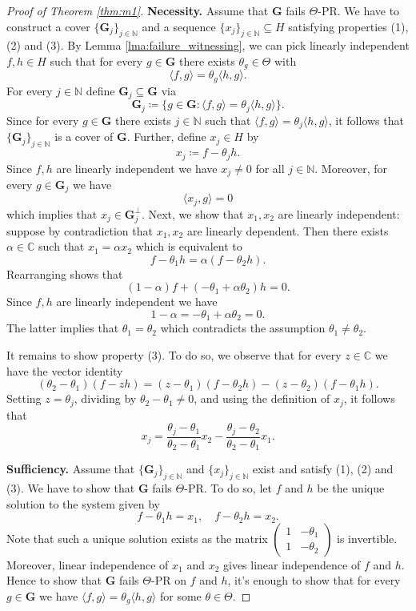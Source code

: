 \documentclass[reqno,a4paper,11pt]{amsart}
\numberwithin{equation}{section}
\def\N{{\mathbb N}}
\def\C{{\mathbb C}}
\newcommand\1{\mathds{1}}
\begin{document}
\begin{proof}[Proof of Theorem \ref{thm:m1}]
\textbf{Necessity.}
Assume that $\mathbf{G}$ fails $\Theta$-PR. We have to construct a cover $\{ \mathbf{G}_j \}_{j \in \N}$ and a sequence $\{ x_j \}_{j \in \N} \subseteq H$ satisfying properties (1), (2) and (3). By Lemma \ref{lma:failure_witnessing}, we can pick linearly independent $f,h \in H$ such that for every $g \in \mathbf{G}$ there exists $\theta_g \in \Theta$ with
$$
\langle f,g \rangle = \theta_g \langle h,g \rangle.
$$
For every $j \in \N$ define $\mathbf{G}_j \subseteq \mathbf{G}$ via
$$
\mathbf{G}_j \coloneqq \{ g \in \mathbf{G} : \langle f,g \rangle = \theta_j \langle h,g \rangle \}.
$$
Since for every $g \in \mathbf{G}$ there exists $j \in \N$ such that $\langle f,g \rangle = \theta_j \langle h,g \rangle$, it follows that $\{ \mathbf{G}_j \}_{j \in \N}$ is a cover of $\mathbf{G}$. Further, define $x_j \in H$ by
$$
x_j \coloneqq f-\theta_j h.
$$
Since $f,h$ are linearly independent we have $x_j \neq 0$ for all $j \in \N$. Moreover, for every $g \in \mathbf{G}_j$ we have
$$
\langle x_j, g \rangle =0
$$
which implies that $x_j \in \mathbf{G}_j^\perp$. Next, we show that $x_1,x_2$ are linearly independent: suppose by contradiction that $x_1,x_2$ are linearly dependent. Then there exists $\alpha \in \C$ such that $x_1 = \alpha x_2$ which is equivalent to
$$
f-\theta_1 h = \alpha ( f-\theta_2 h ).
$$
Rearranging shows that
$$
(1-\alpha) f + (-\theta_1 + \alpha \theta_2) h = 0.
$$
Since $f,h$ are linearly independent we have
$$
1-\alpha = -\theta_1 + \alpha \theta_2 = 0.
$$
The latter implies that $\theta_1 = \theta_2$ which contradicts the assumption $\theta_1 \neq \theta_2$.

It remains to show property (3). To do so, we observe that for every $z \in \C$ we have the vector identity
\begin{equation}\label{eq:vi}
    (\theta_2 - \theta_1)(f-zh) = (z-\theta_1)(f-\theta_2 h) - (z-\theta_2)(f-\theta_1h).
\end{equation}
Setting $z = \theta_j$, dividing by $\theta_2 - \theta_1 \neq 0$, and using the definition of $x_j$, it follows that
$$
x_j = \frac{\theta_j - \theta_1}{\theta_2 - \theta_1} x_2 - \frac{\theta_j - \theta_2}{\theta_2 - \theta_1} x_1.
$$

\textbf{Sufficiency.}
Assume that $\{ \mathbf{G}_j \}_{j \in \N}$ and $\{ x_j \}_{j \in \N}$ exist and satisfy (1), (2) and (3). We have to show that $\mathbf{G}$ fails $\Theta$-PR. To do so, let $f$ and $h$ be the unique solution to the system given by
$$
f-\theta_1 h = x_1, \quad f-\theta_2 h = x_2.
$$
Note that such a unique solution exists as the matrix $\begin{pmatrix}
    1 & -\theta_1 \\
    1 & -\theta_2
\end{pmatrix}$ is invertible. Moreover, linear independence of $x_1$ and $x_2$ gives linear independence of $f$ and $h$. Hence to show that $\mathbf{G}$ fails $\Theta$-PR on $f$ and $h$, it's enough to show that for every $g\in \mathbf{G}$ we have $\langle f,g\rangle = \theta_g\langle h,g\rangle$ for some $\theta \in \Theta$.


\end{proof}
\end{document}
